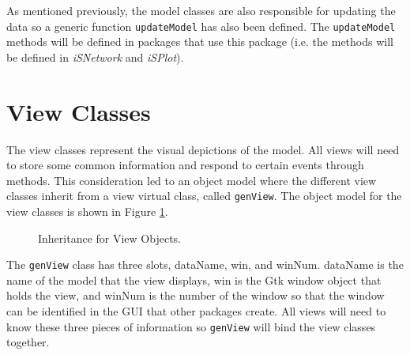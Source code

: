 \documentclass[11pt]{article}
\newcommand{\Rfunction}[1]{{\texttt{#1}}}
\newcommand{\Robject}[1]{{\texttt{#1}}}
\newcommand{\Rpackage}[1]{{\textit{#1}}}
\begin{document}
As mentioned previously, the model classes are also responsible for updating
the data so a generic function \Rfunction{updateModel} has also been 
defined.  The \Rfunction{updateModel} methods will be defined in packages that 
use this package (i.e. the methods will be defined in \Rpackage{iSNetwork} and 
\Rpackage{iSPlot}).

\section{View Classes}\label{Sec:View}

The view classes represent the visual depictions of the model.  All views will
need to store some common information and respond to certain events through
methods.  This consideration led to an object model where the different view
classes inherit from a view virtual class, called \Robject{genView}.  The
object model for the view classes is shown in Figure \ref{Fig:View}.

\begin{figure}[ht]
  \begin{center}
    \caption{ Inheritance for View Objects. }
    \label{Fig:View}
  \end{center}
\end{figure}

The \Robject{genView} class has three slots, dataName, win, and winNum.
dataName is the name of the model that the view displays, win is the Gtk
window object that holds the view, and winNum is the number of the window so
that the window can be identified in the GUI that other packages create.  All 
views will need to know these three pieces of information so \Robject{genView} 
will bind the view classes together. 
\end{document}
